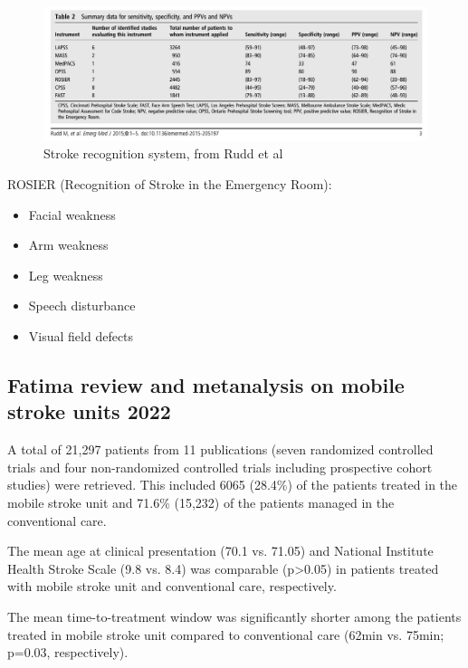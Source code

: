 \begin{figure}
    \centering
    \includegraphics[width=0.9\linewidth]{images_background/rudd.png}
    \caption{Stroke recognition system, from Rudd et al}
    \label{fig:rudd}
\end{figure}

ROSIER (Recognition of Stroke in the Emergency Room):

\begin{itemize}
    \item Facial weakness
    \item Arm weakness
    \item Leg weakness
    \item Speech disturbance
    \item Visual field defects
\end{itemize}




\subsection{Fatima review and metanalysis on mobile stroke units 2022 \cite{fatima_mobile_2020}
}

A total of 21,297 patients from 11 publications (seven randomized controlled trials and four non-randomized controlled trials including prospective cohort studies) were retrieved. This included 6065 (28.4\%) of the patients treated in the mobile stroke unit and 71.6\% (15,232) of the patients managed in the conventional care.

The mean age at clinical presentation (70.1 vs. 71.05) and National Institute Health Stroke Scale (9.8 vs. 8.4) was comparable (p>0.05) in patients treated with mobile stroke unit and conventional care, respectively.

The mean time-to-treatment window was significantly shorter among the patients treated in mobile stroke unit compared to conventional care (62min vs. 75min; p=0.03, respectively).

